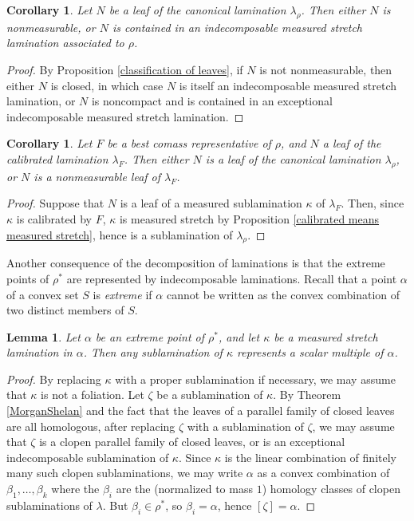\documentclass[reqno,11pt]{amsart}
\newcommand{\dfn}[1]{\emph{#1}\index{#1}}
\newtheorem{lemma}[theorem]{Lemma}
\newtheorem{corollary}[theorem]{Corollary}
\theoremstyle{definition}
\numberwithin{equation}{section}
\begin{document}
\begin{corollary}\label{measurable leaves are contained in indecomposables}
Let $N$ be a leaf of the canonical lamination $\lambda_\rho$.
Then either $N$ is nonmeasurable, or $N$ is contained in an indecomposable measured stretch lamination associated to $\rho$.
\end{corollary}
\begin{proof}
By Proposition \ref{classification of leaves}, if $N$ is not nonmeasurable, then either $N$ is closed, in which case $N$ is itself an indecomposable measured stretch lamination, or $N$ is noncompact and is contained in an exceptional indecomposable measured stretch lamination.
\end{proof}

\begin{corollary}
Let $F$ be a best comass representative of $\rho$, and $N$ a leaf of the calibrated lamination $\lambda_F$.
Then either $N$ is a leaf of the canonical lamination $\lambda_\rho$, or $N$ is a nonmeasurable leaf of $\lambda_F$.
\end{corollary}
\begin{proof}
Suppose that $N$ is a leaf of a measured sublamination $\kappa$ of $\lambda_F$.
Then, since $\kappa$ is calibrated by $F$, $\kappa$ is measured stretch by Proposition \ref{calibrated means measured stretch}, hence is a sublamination of $\lambda_\rho$.
\end{proof}

Another consequence of the decomposition of laminations is that the extreme points of $\rho^*$ are represented by indecomposable laminations.
Recall that a point $\alpha$ of a convex set $S$ is \dfn{extreme} if $\alpha$ cannot be written as the convex combination of two distinct members of $S$.

\begin{lemma}\label{extreme points are closed under sublaminations}
Let $\alpha$ be an extreme point of $\rho^*$, and let $\kappa$ be a measured stretch lamination in $\alpha$.
Then any sublamination of $\kappa$ represents a scalar multiple of $\alpha$.
\end{lemma}
\begin{proof}
By replacing $\kappa$ with a proper sublamination if necessary, we may assume that $\kappa$ is not a foliation.
Let $\zeta$ be a sublamination of $\kappa$.
By Theorem \ref{MorganShelan} and the fact that the leaves of a parallel family of closed leaves are all homologous, after replacing $\zeta$ with a sublamination of $\zeta$, we may assume that $\zeta$ is a clopen parallel family of closed leaves, or is an exceptional indecomposable sublamination of $\kappa$.
Since $\kappa$ is the linear combination of finitely many such clopen sublaminations, we may write $\alpha$ as a convex combination of $\beta_1, \dots, \beta_k$ where the $\beta_i$ are the (normalized to mass $1$) homology classes of clopen sublaminations of $\lambda$.
But $\beta_i \in \rho^*$, so $\beta_i = \alpha$, hence $[\zeta] = \alpha$.
\end{proof}
\end{document}
